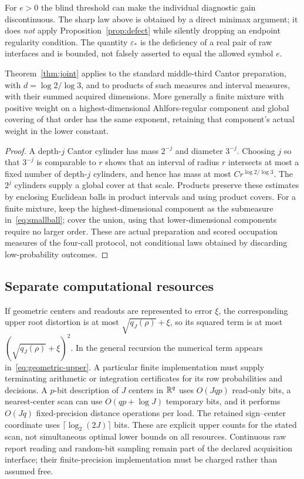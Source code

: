 For $e>0$ the blind threshold can make the individual diagnostic gain discontinuous. The sharp law above is obtained by a direct minimax argument; it does \emph{not} apply Proposition~\ref{prop:defect} while silently dropping an endpoint regularity condition. The quantity $\varepsilon_*$ is the deficiency of a real pair of raw interfaces and is bounded, not falsely asserted to equal the allowed symbol $e$.

\begin{corollary}\label{cor:singular-marks}
Theorem~\ref{thm:joint} applies to the standard middle-third Cantor preparation, with $d=\log2/\log3$, and to products of such measures and interval measures, with their summed acquired dimensions. More generally a finite mixture with positive weight on a highest-dimensional Ahlfors-regular component and global covering of that order has the same exponent, retaining that component's actual weight in the lower constant.
\end{corollary}
\begin{proof}
A depth-$j$ Cantor cylinder has mass $2^{-j}$ and diameter $3^{-j}$. Choosing $j$ so that $3^{-j}$ is comparable to $r$ shows that an interval of radius $r$ intersects at most a fixed number of depth-$j$ cylinders, and hence has mass at most $Cr^{\log2/\log3}$. The $2^j$ cylinders supply a global cover at that scale. Products preserve these estimates by enclosing Euclidean balls in product intervals and using product covers. For a finite mixture, keep the highest-dimensional component as the submeasure in~\eqref{eq:smallball}; cover the union, using that lower-dimensional components require no larger order. These are actual preparation and scored occupation measures of the four-call protocol, not conditional laws obtained by discarding low-probability outcomes.
\end{proof}

\subsection{Separate computational resources}
If geometric centers and readouts are represented to error $\xi$, the corresponding upper root distortion is at most $\sqrt{q_J(\rho)}+\xi$, so its squared term is at most $(\sqrt{q_J(\rho)}+\xi)^2$. In the general recursion the numerical term appears in~\eqref{eq:geometric-upper}. A particular finite implementation must supply terminating arithmetic or integration certificates for its row probabilities and decisions. A $p$-bit description of $J$ centers in $\mathbb R^q$ uses $O(Jqp)$ read-only bits, a nearest-center scan can use $O(qp+\log J)$ temporary bits, and it performs $O(Jq)$ fixed-precision distance operations per load. The retained sign--center coordinate uses $\lceil\log_2(2J)\rceil$ bits. These are explicit upper counts for the stated scan, not simultaneous optimal lower bounds on all resources. Continuous raw report reading and random-bit sampling remain part of the declared acquisition interface; their finite-precision implementation must be charged rather than assumed free.
